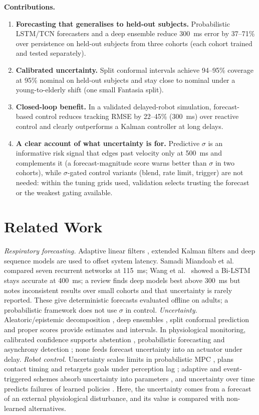 \documentclass[conference]{IEEEtran}
\begin{document}
\textbf{Contributions.}
\begin{enumerate}
\item \textbf{Forecasting that generalises to held-out subjects.} Probabilistic LSTM/TCN forecasters and a deep ensemble reduce 300~ms error by 37--71\% over persistence on held-out subjects from three cohorts (each cohort trained and tested separately).
\item \textbf{Calibrated uncertainty.} Split conformal intervals achieve 94--95\% coverage at 95\% nominal on held-out subjects and stay close to nominal under a young-to-elderly shift (one small Fantasia split).
\item \textbf{Closed-loop benefit.} In a validated delayed-robot simulation, forecast-based control reduces tracking RMSE by 22--45\% (300~ms) over reactive control and clearly outperforms a Kalman controller at long delays.
\item \textbf{A clear account of what uncertainty is for.} Predictive $\sigma$ is an informative risk signal that edges past velocity only at 500~ms and complements it (a forecast-magnitude score warns better than $\sigma$ in two cohorts), while $\sigma$-gated control variants (blend, rate limit, trigger) are not needed: within the tuning grids used, validation selects trusting the forecast or the weakest gating available.
\end{enumerate}

\section{Related Work}
\emph{Respiratory forecasting.} Adaptive linear filters \cite{rArma}, extended Kalman filters \cite{rJung} and deep sequence models are used to offset system latency. Samadi Miandoab et al.\ \cite{rCyber} compared seven recurrent networks at 115~ms; Wang et al.\ \cite{rWangBiLSTM} showed a Bi-LSTM stays accurate at 400~ms; a review \cite{rZhangReview} finds deep models best above 300~ms but notes inconsistent results over small cohorts and that uncertainty is rarely reported. These give deterministic forecasts evaluated offline on adults; a probabilistic framework \cite{rProb} does not use $\sigma$ in control.
\emph{Uncertainty.} Aleatoric/epistemic decomposition \cite{rKendall}, deep ensembles \cite{rEns}, split conformal prediction \cite{rVovk,rAng,rCuqds} and proper scores \cite{rGneiting,rGuo} provide estimates and intervals. In physiological monitoring, calibrated confidence supports abstention \cite{rBergman}, probabilistic forecasting \cite{rDash} and asynchrony detection \cite{rGMGC}; none feeds forecast uncertainty into an actuator under delay.
\emph{Robot control.} Uncertainty scales limits in probabilistic MPC \cite{rKuo}, plans contact timing \cite{rSURE} and retargets goals under perception lag \cite{rULAG}; adaptive and event-triggered schemes absorb uncertainty into parameters \cite{rWangAdaptive,rKang,rPeddi}, and uncertainty over time predicts failures of learned policies \cite{rFail}. Here, the uncertainty comes from a forecast of an external physiological disturbance, and its value is compared with non-learned alternatives.
\end{document}
